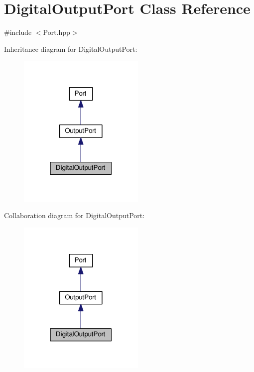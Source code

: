\hypertarget{classDigitalOutputPort}{}\section{Digital\+Output\+Port Class Reference}
\label{classDigitalOutputPort}


{\ttfamily \#include $<$Port.\+hpp$>$}



Inheritance diagram for Digital\+Output\+Port\+:\nopagebreak
\begin{figure}[H]
\begin{center}
\leavevmode
\includegraphics[width=172pt]{classDigitalOutputPort__inherit__graph}
\end{center}
\end{figure}


Collaboration diagram for Digital\+Output\+Port\+:\nopagebreak
\begin{figure}[H]
\begin{center}
\leavevmode
\includegraphics[width=172pt]{classDigitalOutputPort__coll__graph}
\end{center}
\end{figure}
